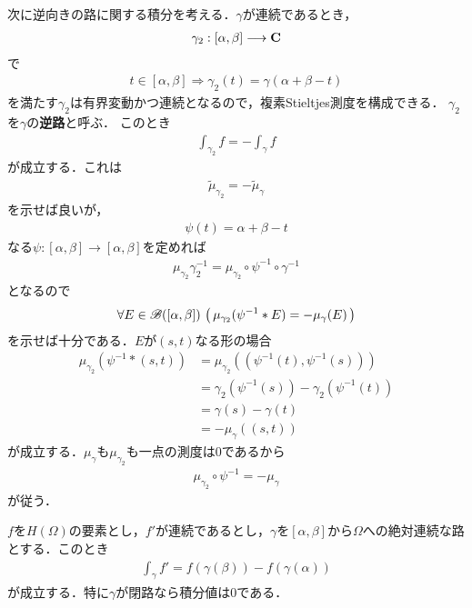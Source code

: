 	次に逆向きの路に関する積分を考える．$\gamma$が連続であるとき，
	\begin{align}
		\gamma_2 : [\alpha,\beta] \longrightarrow \mathbf{C}
	\end{align}
	で
	\begin{align}
		t \in [\alpha, \beta] \Longrightarrow \gamma_2(t) = \gamma(\alpha + \beta - t) 
	\end{align}
	を満たす$\gamma_2$は有界変動かつ連続となるので，複素Stieltjes測度を構成できる．
	$\gamma_2$を$\gamma$の{\bf 逆路}と呼ぶ．
	このとき
	\begin{align}
		\int_{\gamma_2} f = - \int_\gamma f
	\end{align}
	が成立する．これは
	\begin{align}
		\tilde{\mu}_{\gamma_2} = - \tilde{\mu}_\gamma 
	\end{align}
	を示せば良いが，
	\begin{align}
		\psi(t) = \alpha + \beta - t
	\end{align}
	なる$\psi:[\alpha,\beta] \longrightarrow [\alpha,\beta]$を定めれば
	\begin{align}
		\mu_{\gamma_2} \gamma_2^{-1} = \mu_{\gamma_2} \circ \psi^{-1} \circ \gamma^{-1}
	\end{align}
	となるので
	\begin{align}
		\forall E \in \mathscr{B}([\alpha,\beta])\,
		\left(\, \mu_{\gamma_2}(\psi^{-1} \ast E) = -\mu_\gamma(E)\, \right)
	\end{align}
	を示せば十分である．$E$が$(s,t)$なる形の場合
	\begin{align}
		\mu_{\gamma_2}\left(\psi^{-1} \ast (s,t)\right)
		&= \mu_{\gamma_2}\left( \left( \psi^{-1}(t),\psi^{-1}(s) \right) \right) \\
		&= \gamma_2\left(\psi^{-1}(s)\right) - \gamma_2\left(\psi^{-1}(t)\right) \\
		&= \gamma(s) - \gamma(t) \\
		&= -\mu_\gamma((s,t))
	\end{align}
	が成立する．$\mu_\gamma$も$\mu_{\gamma_2}$も一点の測度は$0$であるから
	\begin{align}
		\mu_{\gamma_2} \circ \psi^{-1} = -\mu_\gamma
	\end{align}
	が従う．
	
	\begin{screen}
		\begin{thm}[正則関数に対する微積分学の基本定理]
			$f$を$H(\Omega)$の要素とし，$f'$が連続であるとし，$\gamma$を$[\alpha,\beta]$から$\Omega$への絶対連続な路とする．このとき
			\begin{align}
				\int_{\gamma} f' = f(\gamma(\beta)) - f(\gamma(\alpha))
			\end{align}
			が成立する．特に$\gamma$が閉路なら積分値は$0$である．
		\end{thm}
	\end{screen}
	
